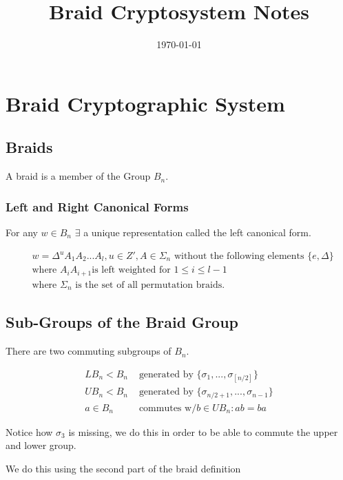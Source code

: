 \documentclass{article}
\title{Braid Cryptosystem Notes}
\date{\today}
\begin{document}
	\maketitle
	
	\section{Braid Cryptographic System}
	
	\subsection{Braids}
	A braid is a member of the Group $B_n$.
	
	\subsubsection{Left and Right Canonical Forms}
	
	For any $w \in B_n$ $\exists$ a unique representation called the left canonical form.
	
	\begin{align*}
		&w = \Delta^u A_1 A_2 ... A_l, u \in Z', A \in \Sigma_n \text{ without the following elements } \{ e, \Delta \} \\
		&\text{where } A_i A_{i+1} \text{is left weighted for } 1 \leq i \leq l - 1 \\
		&\text{where } \Sigma_n \text{ is the set of all permutation braids.}
	\end{align*}
	
	\subsection{Sub-Groups of the Braid Group}
	There are two commuting subgroups of $B_n$.
	
	\begin{align*}
		LB_n < B_n & \text{ generated by } \{ \sigma_1 , ..., \sigma_{ \left[ n/2 \right] } \}  \\
		UB_n < B_n & \text{ generated by } \{ \sigma_{ n/2 + 1 }, ..., \sigma_{n-1} \} \\
		a \in B_n & \text{ commutes w/} b \in UB_n : ab = ba 
	\end{align*}
	
	Notice how $\sigma_3$ is missing, we do this in order to be able to commute the upper and lower group.
	
	We do this using the second part of the braid definition
	
\end{document}
